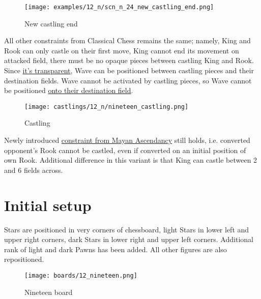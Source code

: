 \vspace*{-0.7\baselineskip}
\noindent
\begin{figure}[!h]
\texttt{[image: examples/12\_n/scn\_n\_24\_new\_castling\_end.png]}
\vspace*{-1.4\baselineskip}
\caption{New castling end}
\label{fig:scn_n_24_new_castling_end}
\end{figure}

\vspace*{-0.7\baselineskip}
All other constraints from Classical Chess remains the same; namely, King and Rook
can only castle on their first move, King cannot end its movement on attacked field,
there must be no opaque pieces between castling King and Rook. %
Since \hyperref[fig:scn_mv_07_wave_is_transparent]{it's transparent}, Wave can be
positioned between castling pieces and their destination fields.
Wave cannot be activated by castling pieces, so Wave cannot be positioned
\hyperref[fig:scn_mv_11_wave_block_castling_rook]{onto their destination field}.

\vspace*{-0.7\baselineskip}
\noindent
\begin{figure}[!h]
\texttt{[image: castlings/12\_n/nineteen\_castling.png]}
\vspace*{-1.4\baselineskip}
\caption{Castling}
\label{fig:nineteen_castling}
\end{figure}

\vspace*{-0.7\baselineskip}
Newly introduced
\hyperref[sec:Mayan Ascendancy/Pyramid/Conversion/Converting Rooks]{constraint from Mayan Ascendancy}
still holds, i.e. converted opponent's Rook cannot be castled, even if converted on
an initial position of own Rook. Additional difference in this variant is that King
can castle between 2 and 6 fields across.

\clearpage %

\section*{Initial setup}
\label{sec:Nineteen/Initial setup}

Stars are positioned in very corners of chessboard, light Stars in lower left and upper right
corners, dark Stars in lower right and upper left corners. Additional rank of light and dark
Pawns has been added. All other figures are also repositioned.

\noindent
\begin{figure}[h]
\texttt{[image: boards/12\_nineteen.png]}
\caption{Nineteen board}
\label{fig:12_nineteen}
\end{figure}

\clearpage %
